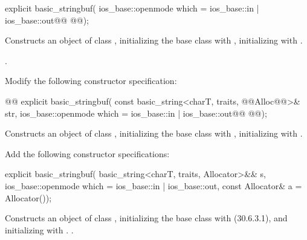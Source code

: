 \documentclass[ebook,11pt,article]{memoir}
\begin{document}
\begin{itemdecl}
explicit basic_stringbuf(
  ios_base::openmode which = ios_base::in | ios_base::out@\added{,}@
  @@);
\end{itemdecl}

\begin{itemdescr}
\pnum
\effects
Constructs an object of class
,
initializing the base class with
,  initializing
with .

\pnum
\postconditions
{}.
\end{itemdescr}

Modify the following constructor specification:
\begin{itemdecl}
@@
explicit basic_stringbuf(
  const basic_string<charT, traits, @@Alloc@@>& str,
  ios_base::openmode which = ios_base::in | ios_base::out@\added{,}@
  @@);
\end{itemdecl}

\begin{itemdescr}
\pnum
\effects
Constructs an object of class
,
initializing the base class with
,  initializing
with .
\end{itemdescr}

Add the following constructor specifications:

\begin{insrt}
\begin{itemdecl}
explicit basic_stringbuf(
  basic_string<charT, traits, Allocator>&& s,
  ios_base::openmode which = ios_base::in | ios_base::out,
  const Allocator\& a = Allocator());
\end{itemdecl}
\begin{itemdescr}
\pnum
\effects Constructs an object of class , initializing the base class with  (30.6.3.1), and initializing  with . 
.
\end{itemdescr}
\end{insrt}
\end{document}
